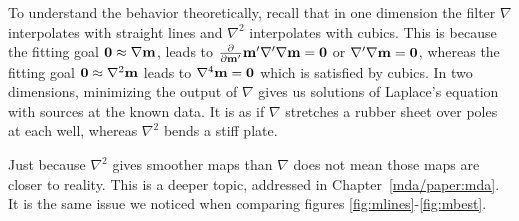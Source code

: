 \par
To understand the behavior theoretically,
recall that in one dimension 
the filter $\nabla$ interpolates with straight lines
and $\nabla^2$ interpolates with cubics.
This is because the fitting goal
$\bold 0 \approx \nabla \bold m$,
leads to
${\partial \over\partial \bold m'} \bold m'\nabla'\nabla \bold m = \bold 0$
or $\nabla'\nabla \bold m = \bold 0$, whereas the fitting goal 
        $\bold 0 \approx \nabla^2 \bold m$
leads to
        $\nabla^4 \bold m = \bold 0$
which is satisfied by cubics.
In two dimensions, minimizing the output of $\nabla$
gives us solutions of Laplace's equation with sources at the known data.
It is as if $\nabla$ stretches a rubber sheet over poles at each well,
whereas $\nabla^2$ bends a stiff plate.
\par
Just because $\nabla^2$ gives smoother maps than  $\nabla$
does not mean those maps are closer to reality.
This is a deeper topic, addressed in Chapter~\ref{mda/paper:mda}.
It is the same issue we noticed when comparing
figures \ref{fig:mlines}-\ref{fig:mbest}.

